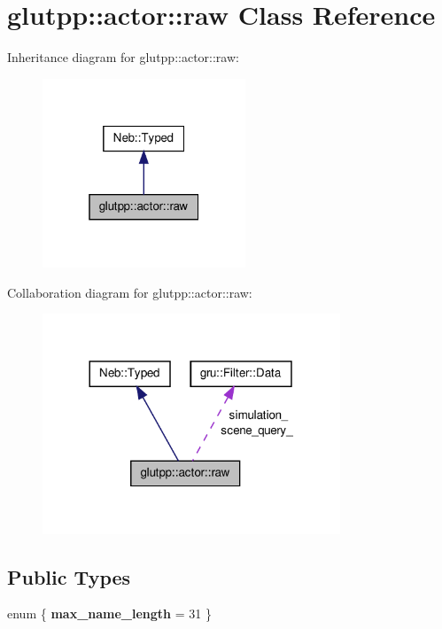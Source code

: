 \hypertarget{classglutpp_1_1actor_1_1raw}{\section{glutpp\-:\-:actor\-:\-:raw \-Class \-Reference}
\label{classglutpp_1_1actor_1_1raw}
}


\-Inheritance diagram for glutpp\-:\-:actor\-:\-:raw\-:\nopagebreak
\begin{figure}[H]
\begin{center}
\leavevmode
\includegraphics[width=172pt]{classglutpp_1_1actor_1_1raw__inherit__graph}
\end{center}
\end{figure}


\-Collaboration diagram for glutpp\-:\-:actor\-:\-:raw\-:\nopagebreak
\begin{figure}[H]
\begin{center}
\leavevmode
\includegraphics[width=252pt]{classglutpp_1_1actor_1_1raw__coll__graph}
\end{center}
\end{figure}
\subsection*{\-Public \-Types}
\begin{DoxyCompactItemize}
\item 
enum \{ {\bfseries max\-\_\-name\-\_\-length} =  31
 \}
\end{DoxyCompactItemize}
